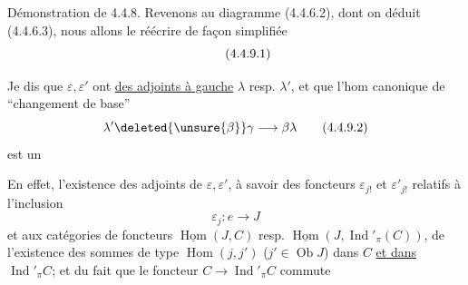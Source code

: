 
Démonstration de 4.4.8. Revenons au diagramme (4.4.6.2), dont on déduit (4.4.6.3), nous allons le réécrire de façon simplifiée
\[\tag*{(4.4.9.1)}\vphantom{B}\]

Je dis que $\varepsilon,\varepsilon'$ ont \uline{des adjoints à gauche} $\lambda$  resp. $\lambda'$, et que l'hom canonique de ``changement de base''
\[
\lambda'\deleted{\unsure{\beta}}\gamma\longrightarrow\beta\lambda\tag*{(4.4.9.2)}
\]
est un 

En effet, l'existence des adjoints de $\varepsilon,\varepsilon'$, à savoir des foncteurs $\varepsilon_{j!}$ et $\varepsilon'_{j!}$ relatifs à l'inclusion
\[
\varepsilon_j:e\longrightarrow J
\]
et aux catégories de foncteurs $\underline{\operatorname{Hom}}(J,C)$ resp. $\underline{\operatorname{Hom}}(J,\operatorname{Ind}'_{\pi}(C))$,  de  l'existence des sommes de type $\operatorname{Hom}(j,j')$ ($j'\in\operatorname{Ob}J$) dans $C$  \uline{et dans} $\operatorname{Ind}'_{\pi}C$; et du fait que le foncteur $C\longrightarrow\operatorname{Ind}'_{\pi}C$ commute
